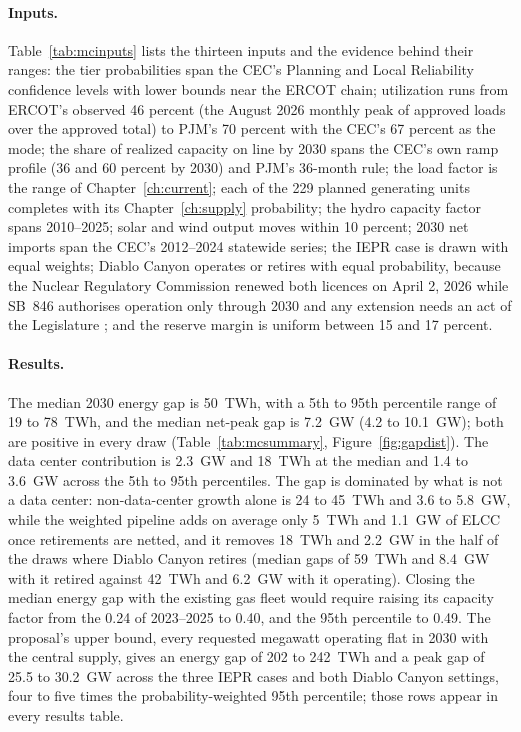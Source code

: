 \paragraph{Inputs.} Table~\ref{tab:mcinputs} lists the thirteen inputs and the evidence behind their ranges: the tier probabilities span the CEC's Planning and Local Reliability confidence levels with lower bounds near the ERCOT chain; utilization runs from ERCOT's observed 46 percent (the August 2026 monthly peak of approved loads over the approved total) to PJM's 70 percent with the CEC's 67 percent as the mode; the share of realized capacity on line by 2030 spans the CEC's own ramp profile (36 and 60 percent by 2030) and PJM's 36-month rule; the load factor is the range of Chapter~\ref{ch:current}; each of the 229 planned generating units completes with its Chapter~\ref{ch:supply} probability; the hydro capacity factor spans 2010--2025; solar and wind output moves within 10 percent; 2030 net imports span the CEC's 2012--2024 statewide series; the IEPR case is drawn with equal weights; Diablo Canyon operates or retires with equal probability, because the Nuclear Regulatory Commission renewed both licences on April 2, 2026 while SB~846 authorises operation only through 2030 and any extension needs an act of the Legislature \citep{gov_ca_diablo2026,nrc_diablo2026}; and the reserve margin is uniform between 15 and 17 percent.

\begin{table}[H]
\centering\scriptsize
\caption{Monte Carlo inputs, distributions and their basis (10,000 draws, seed 20260922).}
\label{tab:mcinputs}
\resizebox{\textwidth}{!}{}
\end{table}

\paragraph{Results.} The median 2030 energy gap is 50~TWh, with a 5th to 95th percentile range of 19 to 78~TWh, and the median net-peak gap is 7.2~GW (4.2 to 10.1~GW); both are positive in every draw (Table~\ref{tab:mcsummary}, Figure~\ref{fig:gapdist}). The data center contribution is 2.3~GW and 18~TWh at the median and 1.4 to 3.6~GW across the 5th to 95th percentiles. The gap is dominated by what is not a data center: non-data-center growth alone is 24 to 45~TWh and 3.6 to 5.8~GW, while the weighted pipeline adds on average only 5~TWh and 1.1~GW of ELCC once retirements are netted, and it removes 18~TWh and 2.2~GW in the half of the draws where Diablo Canyon retires (median gaps of 59~TWh and 8.4~GW with it retired against 42~TWh and 6.2~GW with it operating). Closing the median energy gap with the existing gas fleet would require raising its capacity factor from the 0.24 of 2023--2025 to 0.40, and the 95th percentile to 0.49. The proposal's upper bound, every requested megawatt operating flat in 2030 with the central supply, gives an energy gap of 202 to 242~TWh and a peak gap of 25.5 to 30.2~GW across the three IEPR cases and both Diablo Canyon settings, four to five times the probability-weighted 95th percentile; those rows appear in every results table.

